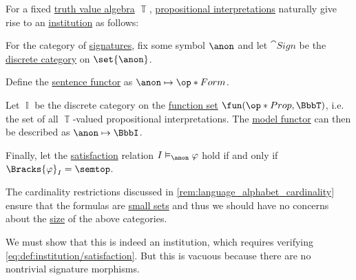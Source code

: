 \begin{definition}\label{def:propositional_institution}\mimprovised
  For a fixed \hyperref[def:truth_value_algebra]{truth value algebra} \( \BbbT \), \hyperref[def:propositional_interpretation]{propositional interpretations} naturally give rise to an \hyperref[def:institution]{institution} as follows:
  \begin{thmenum}
     For the category of \hyperref[def:institution/signatures]{signatures}, fix some symbol \( \anon \) and let \( \cat{Sign} \) be the \hyperref[def:discrete_category]{discrete category} on \( \set{ \anon } \).

     Define the \hyperref[def:institution/sentences]{sentence functor} as \( \anon \mapsto \op*{Form} \).

     Let \( \BbbI \) be the discrete category on the \hyperref[def:set_of_all_functions]{function set} \( \fun(\op*{Prop}, \BbbT) \), i.e. the set of all \( \BbbT \)-valued propositional interpretations. The \hyperref[def:institution/models]{model functor} can then be described as \( \anon \mapsto \BbbI \).

     Finally, let the \hyperref[def:institution/satisfaction]{satisfaction} relation \( I \vDash_{\anon} \varphi \) hold if and only if \( \Bracks{\varphi}_I = \semtop \).
  \end{thmenum}
\end{definition}
\begin{comments}
  \item The cardinality restrictions discussed in \cref{rem:language_alphabet_cardinality} ensure that the formulas are \hyperref[def:small_set]{small sets} and thus we should have no concerns about the \hyperref[def:small_category]{size} of the above categories.
\end{comments}
\begin{defproof}
  We must show that this is indeed an institution, which requires verifying \eqref{eq:def:institution/satisfaction}. But this is vacuous because there are no nontrivial signature morphisms.
\end{defproof}

